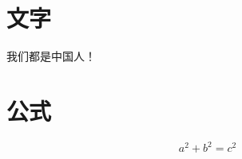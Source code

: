 \documentclass[12pt]{ctexart}
\begin{document}
\section{文字}\label{sec:text}

我们都是中国人！

\section{公式}

\[
a^2 +b^2 = c^2
\]
\end{document}
